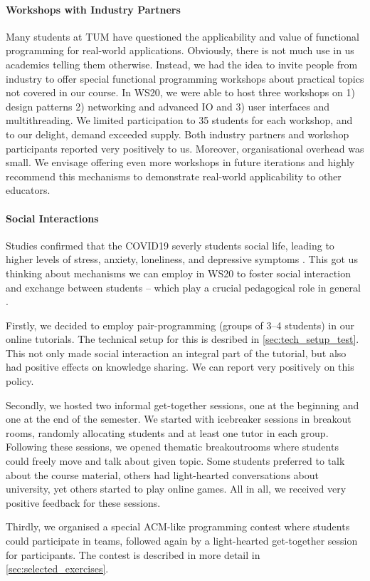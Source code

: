 \paragraph{Workshops with Industry Partners}
Many students at TUM have questioned the applicability and value of functional programming for real-world applications.
Obviously, there is not much use in us academics telling
them otherwise.
Instead, we had the idea to invite people from industry
to offer special functional programming workshops about
practical topics not covered in our course.
In WS20,
we were able to host three workshops on 1) design patterns
2) networking and advanced IO and 3) user interfaces and multithreading.
We limited participation to 35 students for each workshop,
and to our delight, demand exceeded supply.
Both industry partners and workshop participants
reported very positively to us.
Moreover, organisational overhead was small.
We envisage offering even more workshops in future iterations and highly recommend this mechanisms to demonstrate real-world applicability to other educators.

\paragraph{Social Interactions}
Studies confirmed that the COVID19 severly
students social life,
leading to higher levels of stress, anxiety, loneliness, and depressive symptoms \cite{students_lockdown1}.
This got us thinking about mechanisms we
can employ in WS20 to foster social interaction and exchange between students
-- which play a crucial pedagogical role in general .

Firstly, we decided to employ pair-programming (groups of 3--4 students)
in our online tutorials.
The technical setup for this is desribed in \cref{sec:tech_setup_test}.
This not only made social interaction an integral part of the tutorial,
but also had positive effects on knowledge sharing.
We can report very positively on this policy.

Secondly, we hosted two informal get-together sessions,
one at the beginning and one at the end of the semester.
We started with icebreaker sessions in breakout rooms,
randomly allocating students and at least one tutor in each group.
Following these sessions,
we opened thematic breakoutrooms where students
could freely move and talk about
given topic.
Some students preferred to talk about the course material, others had
light-hearted conversations about university, yet others started to play online games.
All in all, we received very positive feedback for these sessions.

Thirdly, we organised a special
ACM-like programming contest
where students could participate in teams,
followed again by a light-hearted get-together session
for participants.
The contest is described in more detail in \cref{sec:selected_exercises}.
